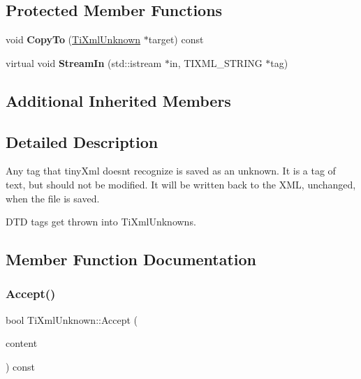 \subsection*{Protected Member Functions}
\begin{DoxyCompactItemize}
\item 
\hypertarget{class_ti_xml_unknown_afeb334446bcbe13ce15131e1629712be}{}\label{class_ti_xml_unknown_afeb334446bcbe13ce15131e1629712be} 
void {\bfseries Copy\+To} (\hyperlink{class_ti_xml_unknown}{Ti\+Xml\+Unknown} $\ast$target) const
\item 
\hypertarget{class_ti_xml_unknown_adf84a317816124a2d7c7947d36170458}{}\label{class_ti_xml_unknown_adf84a317816124a2d7c7947d36170458} 
virtual void {\bfseries Stream\+In} (std\+::istream $\ast$in, T\+I\+X\+M\+L\+\_\+\+S\+T\+R\+I\+NG $\ast$tag)
\end{DoxyCompactItemize}
\subsection*{Additional Inherited Members}


\subsection{Detailed Description}
Any tag that tiny\+Xml doesn\textquotesingle{}t recognize is saved as an unknown. It is a tag of text, but should not be modified. It will be written back to the X\+ML, unchanged, when the file is saved.

D\+TD tags get thrown into Ti\+Xml\+Unknowns. 

\subsection{Member Function Documentation}
\hypertarget{class_ti_xml_unknown_aafdf1b2d4f561979c7907bad91004999}{}\label{class_ti_xml_unknown_aafdf1b2d4f561979c7907bad91004999} 
\subsubsection{\texorpdfstring{Accept()}{Accept()}}
{\footnotesize\ttfamily bool Ti\+Xml\+Unknown\+::\+Accept (\begin{DoxyParamCaption}\item[{\hyperlink{class_ti_xml_visitor}{Ti\+Xml\+Visitor} $\ast$}]{content }\end{DoxyParamCaption}) const\hspace{0.3cm}{\ttfamily [virtual]}}

